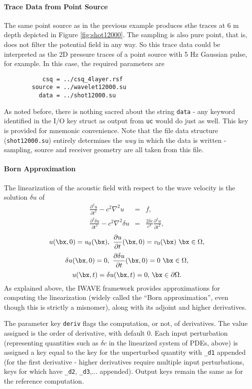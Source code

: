 \noindent \paragraph{Trace Data from Point Source}
The same point source as in the previous example produces sthe traces
at 6 m depth depicted in Figure \ref{fig:shot12000}. The sampling is
also pure point, that is, does not filter the potential field in any
way. So this trace data could be interpreted as the 2D pressure
traces of a point source with 5 Hz Gaussian pulse, for example.
In this case, the required parameters are
\begin{verbatim}
           csq = ../csq_4layer.rsf
        source = ../wavelet12000.su
          data = ../shot12000.su
\end{verbatim}
As noted before, there is nothing sacred about the string {\tt data} -
any keyword identified in the I/O key struct as output from {\tt uc}
would do just as well. This key is provided for mnemonic convenience.
Note that the file data structure ({\tt shot12000.su}) entirely
determines the  {\em way} in which the data is written - sampling,
source and receiver geometry are all taken from this file.

\noindent \paragraph{Born Approximation}
The linearization of the acoustic field with respect to the wave
velocity is the solution $\delta u$ of
\begin{eqnarray}
\frac{\partial^2 u}{\partial t^2} - c^2 \nabla^2 u & = & f,\\
\frac{\partial^2 \delta u}{\partial t^2} - c^2 \nabla^2 \delta u & = &
\frac{2\delta c}{c^3}\frac{\partial^2 u}{\partial t^2},
\end{eqnarray}
\[
u(\bx,0) = u_0(\bx),\,\,\frac{\partial u}{\partial t}(\bx,0) =
v_0(\bx)\,\, \bx \in \Omega,
\]
\[
\delta u(\bx,0) = 0,\,\,\frac{\partial \delta u}{\partial t}(\bx,0) =
0\,\, \bx \in \Omega,
\]
\[
u(\bx,t) = \delta u(\bx,t) = 0, \,\bx \in \partial \Omega.
\]
As explained above, the IWAVE framework provides approximations for
computing the linearization (widely called the ``Born approximation'',
even though this is strictly a misnomer), along with its adjoint and
higher derivatives. 

The parameter key {\tt deriv} flags the computation, or not, of
derivatives. The value assigned is the order of derivative, with
default 0. Each input perturbation (representing quantities such as
$\delta c$ in the linearized system of PDEs, above) is assigned a key
equal to the key for the unperturbed quantity with {\tt \_d1} appended
(for the first derivative - higher derivatives require multiple input
perturbations, keys for which have {\tt \_d2},
{\tt \_d3},... appended). Output keys remain the same as for the reference
computation. 

